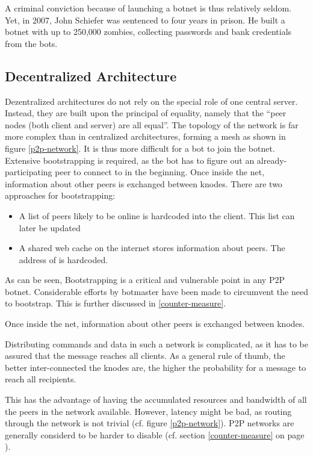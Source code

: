 \documentclass{llncs}
\begin{document}
 A criminal conviction because of launching a botnet is thus
 relatively seldom. Yet, in 2007, John Schiefer was sentenced to four
 years in prison. He built a botnet with up to 250,000 zombies,
 collecting passwords and bank credentials from the bots.\cite{BotnetCrime}

\subsection{Decentralized Architecture}
\label{decent}
Dezentralized architectures do not rely on the special role of one
central server. Instead, they are built upon the principal of
equality, namely that the ``peer nodes (both client and server) are
all equal''\cite{steggink2007detection}. The topology of the network
is far more complex than in centralized architectures, forming a mesh
as shown in figure \ref{p2p-network}. It is thus more difficult for a
bot to join the botnet. Extensive bootstrapping is required, as the
bot has to figure out an already-participating peer to connect to in the
beginning. Once inside the net, information about other peers is
exchanged between knodes. There are two approaches for bootstrapping\cite{wang2009systematic}:
\begin{itemize}
\item A list of peers likely to be online is hardcoded into the client. This list can later be updated
\item A shared web cache on the internet stores information about
  peers. The address of is hardcoded.
\end{itemize}

As can be seen, Bootstrapping is a critical and vulnerable point in
any P2P botnet. Considerable efforts by botmaster have been made to
circumvent the need to bootstrap\cite{td1sc}. This is further
discussed in \ref{counter-measure}.

Once inside the net, information about other peers is
exchanged between knodes.

Distributing commands and data in such a network is complicated, as it
has to be assured that the message reaches all clients. As a general
rule of thumb, the better inter-connected the knodes are, the higher
the probability for a message to reach all recipients.

This has the advantage of having the accumulated resources and
bandwidth of all the peers in the network available. However, latency
might be bad, as routing through the network is not trivial
(cf. figure \ref{p2p-network}). P2P networks are generally considerd
to be harder to disable (cf. section \ref{counter-measure} on page
\pageref{counter-measure}).
\end{document}
